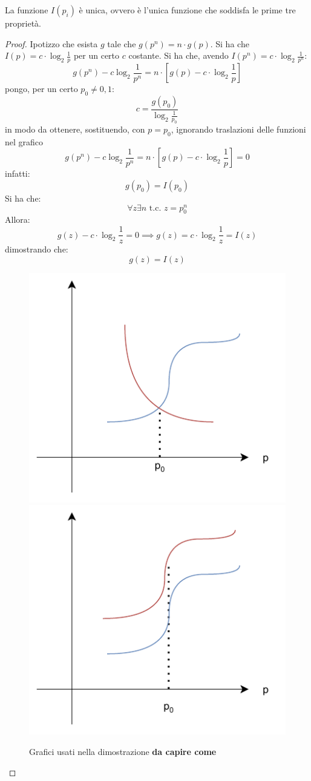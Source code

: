 \documentclass[a4paper,12pt, oneside]{book}
\begin{document}
\begin{teorema}
  La funzione $I(p_i)$ è unica, ovvero è l'unica funzione che soddisfa le prime
  tre proprietà. 
\end{teorema}
\begin{proof}
  Ipotizzo che esista $g$ tale che $g(p^n)=n\cdot g(p)$. Si ha che $I(p)=c\cdot
  \log_2\frac{1}{p}$ per un certo $c$ costante. Si ha che, avendo $I(p^n)=c\cdot
  \log_2\frac{1}{p^n}$:
  \[g(p^n)-c\log_2\frac{1}{p^n}=n\cdot\left[g(p)-c\cdot \log_2
      \frac{1}{p}\right]\] 
  pongo, per un certo $p_0\neq 0,1$:
  \[c=\frac{g(p_0)}{\log_2\frac{1}{p_0}}\]
  in modo da ottenere, sostituendo, con $p=p_0$, ignorando traslazioni delle
  funzioni nel grafico
  \[g(p^n)-c\log_2\frac{1}{p^n}=n\cdot\left[g(p)-c\cdot \log_2
      \frac{1}{p}\right]=0\] 
  infatti:
  \[g(p_0)=I(p_0)\]
  Si ha che:
  \[\forall z\exists n\mbox{ t.c. }z=p_0^n\]
  Allora:
  \[g(z)-c\cdot \log_2\frac{1}{z}=0\implies g(z)=c\cdot\log_2\frac{1}{z}=I(z)\]
  dimostrando che:
  \[g(z)=I(z)\]
  \begin{figure}[H]
    \centering
    \includegraphics[scale = 0.6]{img/grap2.pdf}
    \includegraphics[scale = 0.6]{img/grap3.pdf}
    \caption{Grafici usati nella dimostrazione \textbf{da capire come}}
  \end{figure}
\end{proof}
\end{document}
